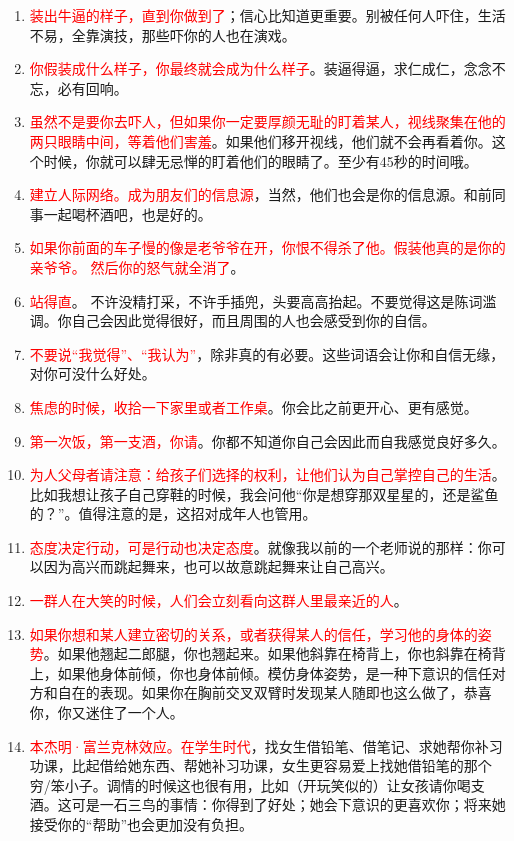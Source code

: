 \documentclass[12pt,oneside]{book}
\begin{document}
\begin{tcolorbox}[colback=orange!5,colframe=orange!75!black]
	\begin{enumerate}
\item \textcolor{red}{装出牛逼的样子，直到你做到了}；信心比知道更重要。别被任何人吓住，生活不易，全靠演技，那些吓你的人也在演戏。
\item \textcolor{red}{你假装成什么样子，你最终就会成为什么样子}。装逼得逼，求仁成仁，念念不忘，必有回响。
\item \textcolor{red}{虽然不是要你去吓人，但如果你一定要厚颜无耻的盯着某人，视线聚集在他的两只眼睛中间，等着他们害羞}。如果他们移开视线，他们就不会再看着你。这个时候，你就可以肆无忌惮的盯着他们的眼睛了。至少有45秒的时间哦。
\item \textcolor{red}{建立人际网络。成为朋友们的信息源}，当然，他们也会是你的信息源。和前同事一起喝杯酒吧，也是好的。
\item \textcolor{red}{如果你前面的车子慢的像是老爷爷在开，你恨不得杀了他。假装他真的是你的亲爷爷。 然后你的怒气就全消了}。
\item \textcolor{red}{站得直}。 不许没精打采，不许手插兜，头要高高抬起。不要觉得这是陈词滥调。你自己会因此觉得很好，而且周围的人也会感受到你的自信。
\item \textcolor{red}{不要说“我觉得”、“我认为”}，除非真的有必要。这些词语会让你和自信无缘，对你可没什么好处。
\item \textcolor{red}{焦虑的时候，收拾一下家里或者工作桌}。你会比之前更开心、更有感觉。
\item \textcolor{red}{第一次饭，第一支酒，你请}。你都不知道你自己会因此而自我感觉良好多久。
\item \textcolor{red}{为人父母者请注意：给孩子们选择的权利，让他们认为自己掌控自己的生活}。比如我想让孩子自己穿鞋的时候，我会问他“你是想穿那双星星的，还是鲨鱼的？”。值得注意的是，这招对成年人也管用。
\item \textcolor{red}{态度决定行动，可是行动也决定态度}。就像我以前的一个老师说的那样：你可以因为高兴而跳起舞来，也可以故意跳起舞来让自己高兴。
\item \textcolor{red}{一群人在大笑的时候，人们会立刻看向这群人里最亲近的人}。
\item \textcolor{red}{如果你想和某人建立密切的关系，或者获得某人的信任，学习他的身体的姿势}。如果他翘起二郎腿，你也翘起来。如果他斜靠在椅背上，你也斜靠在椅背上，如果他身体前倾，你也身体前倾。模仿身体姿势，是一种下意识的信任对方和自在的表现。如果你在胸前交叉双臂时发现某人随即也这么做了，恭喜你，你又迷住了一个人。

\item \textcolor{red}{本杰明·富兰克林效应。在学生时代}，找女生借铅笔、借笔记、求她帮你补习功课，比起借给她东西、帮她补习功课，女生更容易爱上找她借铅笔的那个穷/笨小子。调情的时候这也很有用，比如（开玩笑似的）让女孩请你喝支酒。这可是一石三鸟的事情：你得到了好处；她会下意识的更喜欢你；将来她接受你的“帮助”也会更加没有负担。

\end{enumerate}
\end{tcolorbox}
\end{document}
